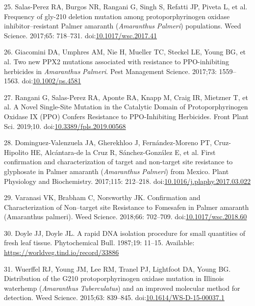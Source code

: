 \documentclass[10pt,letterpaper]{article}
\begin{document}
\leavevmode\hypertarget{ref-salas-perez_frequency_2017}{}%
25. Salas-Perez RA, Burgos NR, Rangani G, Singh S, Refatti JP, Piveta L,
et al. Frequency of gly-210 deletion mutation among protoporphyrinogen
oxidase inhibitor--resistant Palmer amaranth (\emph{Amaranthus}
\emph{Palmeri}) populations. Weed Science. 2017;65: 718--731.
doi:\href{https://doi.org/10.1017/wsc.2017.41}{10.1017/wsc.2017.41}

\leavevmode\hypertarget{ref-giacomini_two_2017-1}{}%
26. Giacomini DA, Umphres AM, Nie H, Mueller TC, Steckel LE, Young BG,
et al. Two new PPX2 mutations associated with resistance to
PPO-inhibiting herbicides in \emph{Amaranthus} \emph{Palmeri}. Pest
Management Science. 2017;73: 1559--1563.
doi:\href{https://doi.org/10.1002/ps.4581}{10.1002/ps.4581}

\leavevmode\hypertarget{ref-rangani_novel_2019}{}%
27. Rangani G, Salas-Perez RA, Aponte RA, Knapp M, Craig IR, Mietzner T,
et al. A Novel Single-Site Mutation in the Catalytic Domain of
Protoporphyrinogen Oxidase IX (PPO) Confers Resistance to PPO-Inhibiting
Herbicides. Front Plant Sci. 2019;10.
doi:\href{https://doi.org/10.3389/fpls.2019.00568}{10.3389/fpls.2019.00568}

\leavevmode\hypertarget{ref-dominguez-valenzuela_first_2017}{}%
28. Dominguez-Valenzuela JA, Gherekhloo J, Fernández-Moreno PT,
Cruz-Hipolito HE, Alcántara-de la Cruz R, Sánchez-González E, et al.
First confirmation and characterization of target and non-target site
resistance to glyphosate in Palmer amaranth (\emph{Amaranthus}
\emph{Palmeri}) from Mexico. Plant Physiology and Biochemistry.
2017;115: 212--218.
doi:\href{https://doi.org/10.1016/j.plaphy.2017.03.022}{10.1016/j.plaphy.2017.03.022}

\leavevmode\hypertarget{ref-varanasi_confirmation_2018}{}%
29. Varanasi VK, Brabham C, Norsworthy JK. Confirmation and
Characterization of Non--target site Resistance to Fomesafen in Palmer
amaranth (Amaranthus palmeri). Weed Science. 2018;66: 702--709.
doi:\href{https://doi.org/10.1017/wsc.2018.60}{10.1017/wsc.2018.60}

\leavevmode\hypertarget{ref-doyle_rapid_1987}{}%
30. Doyle JJ, Doyle JL. A rapid DNA isolation procedure for small
quantities of fresh leaf tissue. Phytochemical Bull. 1987;19: 11--15.
Available: \url{https://worldveg.tind.io/record/33886}

\leavevmode\hypertarget{ref-wuerffel_distribution_2015}{}%
31. Wuerffel RJ, Young JM, Lee RM, Tranel PJ, Lightfoot DA, Young BG.
Distribution of the G210 protoporphyrinogen oxidase mutation in Illinois
waterhemp (\emph{Amaranthus} \emph{Tuberculatus}) and an improved
molecular method for detection. Weed Science. 2015;63: 839--845.
doi:\href{https://doi.org/10.1614/WS-D-15-00037.1}{10.1614/WS-D-15-00037.1}
\end{document}
